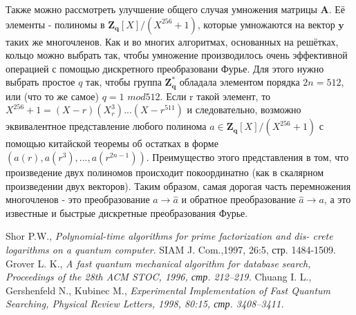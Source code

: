 \documentclass{article}
\begin{document}
	Также можно рассмотреть улучшение общего случая умножения матрицы $\mathbf{A}$. Её элементы - полиномы в $\mathbf{Z_{q}}[X]/(X^{256}+1)$, которые умножаются на вектор $\mathbf{y}$ таких же многочленов. Как и во многих алгоритмах, основанных на решётках, кольцо можно выбрать так, чтобы умножение производилось очень эффективной операцией с помощью дискретного преобразовани Фурье. Для этого нужно выбрать простое $q$ так, чтобы группа $\mathbf{Z_{q}^{*}}$ обладала элементом порядка $2n=512$, или (что то же самое) $q=1$ $mod512$. Если r такой элемент, то $X^{256}+1=(X-r)(X_r^3)...(X-r^511)$ и следовательно, возможно эквивалентное представление любого полинома $a \in \mathbf{Z_{q}}[X]/(X^{256}+1)$ с помощью китайской теоремы об остатках в форме $(a(r), a(r^3),...,a(r^{2n-1}))$. Преимущество этого представления в том, что произведение двух полиномов происходит покоординатно (как в скалярном произведении двух векторов). Таким образом, самая дорогая часть перемножения многочленов - это преобразование $a \rightarrow \hat{a}$ и обратное преобразование $\hat{a} \rightarrow a$, а это известные и быстрые дискретные преобразования Фурье.
\newpage

\def\refname{
		Источники
}

\begin{thebibliography}{9} 
	 Shor P.W., \emph{Polynomial-time algorithms for prime factorization and dis-
		crete logarithms on a quantum computer}. SIAM J. Com.,1997, 26:5,
		стр. 1484-1509.
 Grover L. K., \emph{A fast quantum mechanical algorithm for database search, Proceedings of the 28th ACM STOC, 1996, стр. 212–219.
	}
 Chuang I. L., Gershenfeld N., Kubinec M., \emph{Experimental Implementation
	of Fast Quantum Searching, Physical Review Letters, 1998, 80:15,
		стр. 3408–3411.
}
 \end{thebibliography} 
\end{document}
